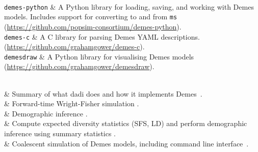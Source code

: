 \toprule
{}\\
\midrule
\texttt{demes-python} &
    A Python library for loading, saving, and working with
    Demes models. Includes support for converting to and from
    \texttt{ms}~\citep{hudson2002generating}
    (\url{https://github.com/popsim-consortium/demes-python}).\\

\texttt{demes-c} &
    A C library for parsing Demes YAML descriptions.
    (\url{https://github.com/grahamgower/demes-c}). \\

\texttt{demesdraw} &
    A Python library for visualising Demes models
    (\url{https://github.com/grahamgower/demesdraw}). \\

\midrule
{}\\
\midrule


\dadi &
    Summary of what dadi does and how it implements Demes~\citep{gutenkunst2009inferring}.
    \\

\fwdpy &
    Forward-time Wright-Fisher simulation \citep{thornton2014cpp,thornton2019-nu}.\\

\gadma &
    Demographic inference \citep{noskova2020gadma}.\\

\moments &
    Compute expected diversity statistics (SFS, LD) and perform
    demographic inference using summary statistics
    \citep{jouganous2017inferring,ragsdale2019models}.\\

\msprime &
    Coalescent simulation of Demes models, including command line
    interface~\citep{kelleher2016efficient,kelleher2020coalescent,baumdicker2021-iu}.\\

\bottomrule   
